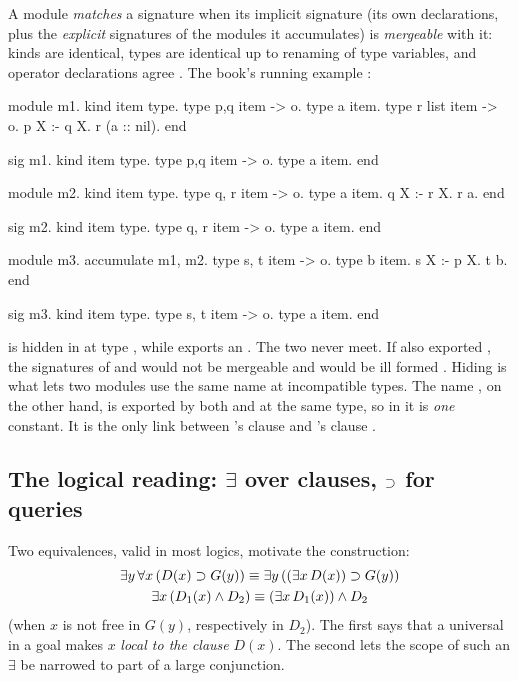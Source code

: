 A module \emph{matches} a signature when its implicit signature (its own declarations, plus the
\emph{explicit} signatures of the modules it accumulates) is \emph{mergeable} with it: kinds are
identical, types are identical up to renaming of type variables, and operator declarations agree
. The book's running example :
\begin{lprolog}
module m1.
kind   item   type.
type   p,q    item -> o.
type   a      item.
type   r      list item -> o.
p X :- q X.
r (a :: nil).
end

sig m1.
kind   item   type.
type   p,q    item -> o.
type   a      item.
end
\end{lprolog}
\begin{lprolog}
module m2.
kind   item   type.
type   q, r   item -> o.
type   a      item.
q X :- r X.
r a.
end

sig m2.
kind   item   type.
type   q, r   item -> o.
type   a      item.
end
\end{lprolog}
\begin{lprolog}
module m3.
accumulate m1, m2.
type   s, t   item -> o.
type   b      item.
s X :- p X.
t b.
end

sig m3.
kind   item   type.
type   s, t   item -> o.
type   a      item.
end
\end{lprolog}
 is hidden in  at type , while  exports an . The
two never meet. If  also exported , the signatures of  and  would not be
mergeable and  would be ill formed . Hiding is what lets two modules use the same
name at incompatible types. The name , on the other hand, is exported by both  and
 at the same type, so in  it is \emph{one} constant. It is the only link between
's clause  and 's clause .

\subsection{The logical reading: \texorpdfstring{$\exists$}{exists} over clauses, \texorpdfstring{$\supset$}{implication} for queries}\label{sec:hoprog-eformulas}

Two equivalences, valid in most logics, motivate the construction\newline{}:
\begin{gather*}
\exists y\,\forall x\,(D(x)\supset G(y)) \equiv \exists y\,((\exists x\,D(x))\supset G(y))
\\
\exists x\,(D_1(x)\wedge D_2) \equiv (\exists x\,D_1(x))\wedge D_2
\end{gather*}
(when $x$ is not free in $G(y)$, respectively in $D_2$). The first says that a universal in a goal makes
$x$ \emph{local to the clause} $D(x)$. The second lets the scope of such an $\exists$ be narrowed to part of
a large conjunction.

